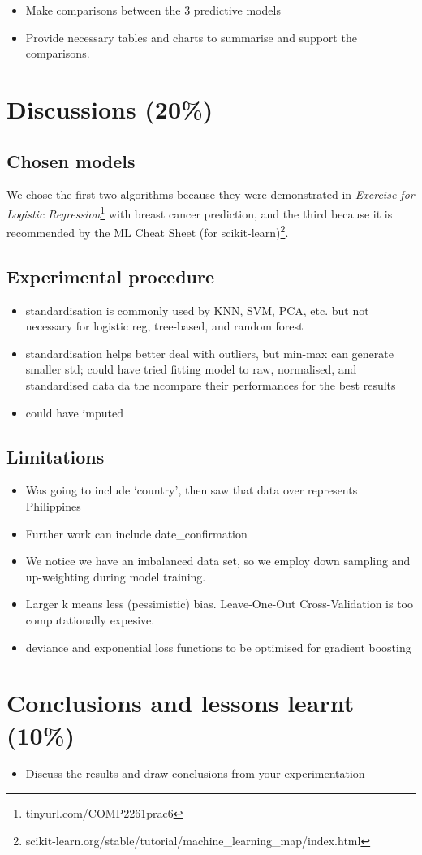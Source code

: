 \documentclass[twoside,11pt]{article}
\begin{document}
\begin{itemize}
    \item Make comparisons between the 3 predictive models
    \item Provide necessary tables and charts to summarise and support the comparisons.
\end{itemize}

\section{Discussions (20\%)}
\subsection{Chosen models}
We chose the first two algorithms because they were demonstrated in \emph{Exercise for Logistic Regression}\footnote{tinyurl.com/COMP2261prac6} with breast cancer prediction, and the third because it is recommended by the ML Cheat Sheet (for scikit-learn)\footnote{scikit-learn.org/stable/tutorial/machine\_learning\_map/index.html}.
\subsection{Experimental procedure}
\begin{itemize}
    \item standardisation is commonly used by KNN, SVM, PCA, etc. but not necessary for logistic reg, tree-based, and random forest
    \item standardisation helps better deal with outliers, but min-max can generate smaller std; could have tried fitting model to raw, normalised, and standardised data da the ncompare their performances for the best results
    \item could have imputed
\end{itemize}
\subsection{Limitations}
\begin{itemize}
    \item Was going to include `country', then saw that data over represents Philippines
    \item Further work can include date\_confirmation
    \item We notice we have an imbalanced data set, so we employ down sampling and up-weighting during model training.
    \item Larger k means less (pessimistic) bias. Leave-One-Out Cross-Validation is too computationally expesive.
    \item  deviance and exponential loss functions to be optimised for gradient boosting
\end{itemize}

\section{Conclusions and lessons learnt (10\%)}
\begin{itemize}
    \item Discuss the results and draw conclusions from your experimentation
\end{itemize}




\vskip 0.2in

\end{document}
